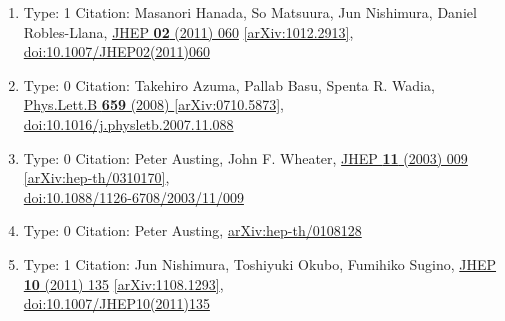 \documentclass[a4paper,10pt]{article}
\begin{document}
\begin{enumerate}
\begin{enumerate}
  \item Type: 1 Citation: Masanori Hanada, So Matsuura, Jun Nishimura, Daniel Robles-Llana, \href{https://www.doi.org/10.1007/JHEP02(2011)060}{JHEP {\bf 02} (2011) 060}  \href{https://arxiv.org/abs/1012.2913}{[arXiv:1012.2913]},\\\href{https://www.doi.org/10.1007/JHEP02(2011)060}{doi:10.1007/JHEP02(2011)060}
  \item Type: 0 Citation: Takehiro Azuma, Pallab Basu, Spenta R. Wadia, \href{https://www.doi.org/10.1016/j.physletb.2007.11.088}{Phys.Lett.B {\bf 659} (2008) }  \href{https://arxiv.org/abs/0710.5873}{[arXiv:0710.5873]},\\\href{https://www.doi.org/10.1016/j.physletb.2007.11.088}{doi:10.1016/j.physletb.2007.11.088}
  \item Type: 0 Citation: Peter Austing, John F. Wheater, \href{https://www.doi.org/10.1088/1126-6708/2003/11/009}{JHEP {\bf 11} (2003) 009}  \href{https://arxiv.org/abs/hep-th/0310170}{[arXiv:hep-th/0310170]},\\\href{https://www.doi.org/10.1088/1126-6708/2003/11/009}{doi:10.1088/1126-6708/2003/11/009}
  \item Type: 0 Citation: Peter Austing, \href{https://arxiv.org/abs/hep-th/0108128}{arXiv:hep-th/0108128}
  \item Type: 1 Citation: Jun Nishimura, Toshiyuki Okubo, Fumihiko Sugino, \href{https://www.doi.org/10.1007/JHEP10(2011)135}{JHEP {\bf 10} (2011) 135}  \href{https://arxiv.org/abs/1108.1293}{[arXiv:1108.1293]},\\\href{https://www.doi.org/10.1007/JHEP10(2011)135}{doi:10.1007/JHEP10(2011)135}

\end{enumerate}
\end{enumerate}
\end{document}

